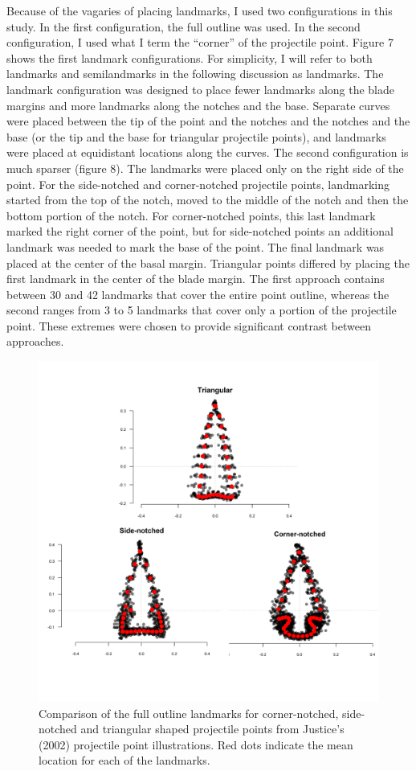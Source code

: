 \documentclass[letterpaper]{article}
\begin{document}
Because of the vagaries of placing landmarks, I used two configurations in this study. In the first configuration, the full outline was used. In the second configuration, I used what I term the ``corner'' of the projectile point. Figure 7 shows the first landmark configurations. For simplicity, I will refer to both landmarks and semilandmarks in the following discussion as landmarks. The landmark configuration was designed to place fewer landmarks along the blade margins and more landmarks along the notches and the base. Separate curves were placed between the tip of the point and the notches and the notches and the base (or the tip and the base for triangular projectile points), and landmarks were placed at equidistant locations along the curves. The second configuration is much sparser (figure 8). The landmarks were placed only on the right side of the point. For the side-notched and corner-notched projectile points, landmarking started from the top of the notch, moved to the middle of the notch and then the bottom portion of the notch. For corner-notched points, this last landmark marked the right corner of the point, but for side-notched points an additional landmark was needed to mark the base of the point. The final landmark was placed at the center of the basal margin. Triangular points differed by placing the first landmark in the center of the blade margin. The first approach contains between 30 and 42 landmarks that cover the entire point outline, whereas the second ranges from 3 to 5 landmarks that cover only a portion of the projectile point. These extremes were chosen to provide significant contrast between approaches.

\begin{figure}
\includegraphics[width=1\linewidth]{figures/curveComparison} \caption{Comparison of the full outline landmarks for corner-notched, side-notched and triangular shaped projectile points from Justice's (2002) projectile point illustrations. Red dots indicate the mean location for each of the landmarks.}\label{fig:curvesStack}
\end{figure}
\end{document}
